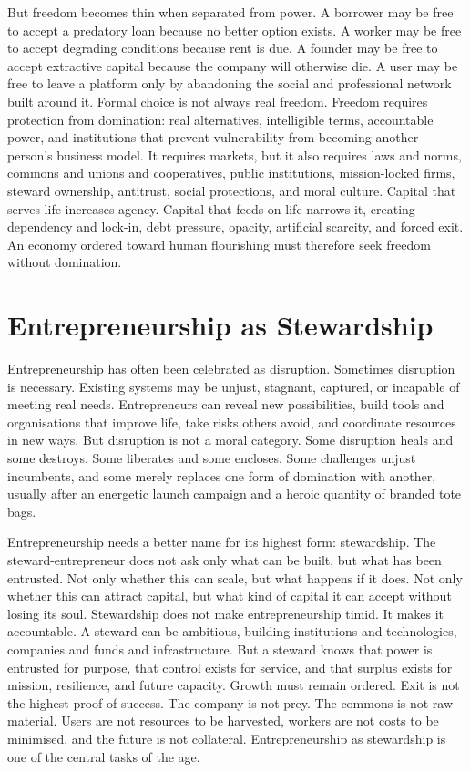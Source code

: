 \documentclass[11pt,a4paper,oneside]{book}
\begin{document}
But freedom becomes thin when separated from power. A borrower may be free to accept a predatory loan because no better option exists. A worker may be free to accept degrading conditions because rent is due. A founder may be free to accept extractive capital because the company will otherwise die. A user may be free to leave a platform only by abandoning the social and professional network built around it. Formal choice is not always real freedom. Freedom requires protection from domination: real alternatives, intelligible terms, accountable power, and institutions that prevent vulnerability from becoming another person's business model. It requires markets, but it also requires laws and norms, commons and unions and cooperatives, public institutions, mission-locked firms, steward ownership, antitrust, social protections, and moral culture. Capital that serves life increases agency. Capital that feeds on life narrows it, creating dependency and lock-in, debt pressure, opacity, artificial scarcity, and forced exit. An economy ordered toward human flourishing must therefore seek freedom without domination.

\section*{Entrepreneurship as Stewardship}

Entrepreneurship has often been celebrated as disruption. Sometimes disruption is necessary. Existing systems may be unjust, stagnant, captured, or incapable of meeting real needs. Entrepreneurs can reveal new possibilities, build tools and organisations that improve life, take risks others avoid, and coordinate resources in new ways. But disruption is not a moral category. Some disruption heals and some destroys. Some liberates and some encloses. Some challenges unjust incumbents, and some merely replaces one form of domination with another, usually after an energetic launch campaign and a heroic quantity of branded tote bags.

Entrepreneurship needs a better name for its highest form: stewardship. The steward-entrepreneur does not ask only what can be built, but what has been entrusted. Not only whether this can scale, but what happens if it does. Not only whether this can attract capital, but what kind of capital it can accept without losing its soul. Stewardship does not make entrepreneurship timid. It makes it accountable. A steward can be ambitious, building institutions and technologies, companies and funds and infrastructure. But a steward knows that power is entrusted for purpose, that control exists for service, and that surplus exists for mission, resilience, and future capacity. Growth must remain ordered. Exit is not the highest proof of success. The company is not prey. The commons is not raw material. Users are not resources to be harvested, workers are not costs to be minimised, and the future is not collateral. Entrepreneurship as stewardship is one of the central tasks of the age.
\end{document}
